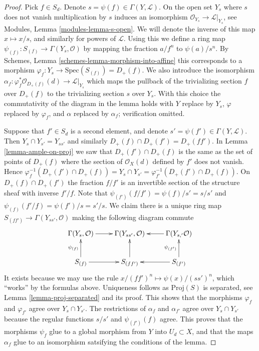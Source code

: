 \begin{proof}
Pick $f \in S_d$. Denote $s = \psi(f) \in \Gamma(Y, \mathcal{L})$.
On the open set $Y_s$ where $s$ does not vanish multiplication
by $s$ induces an isomorphism $\mathcal{O}_{Y_s} \to \mathcal{L}|_{Y_s}$,
see Modules, Lemma \ref{modules-lemma-s-open}. We will denote
the inverse of this map $x \mapsto x/s$, and similarly for
powers of $\mathcal{L}$. Using this we
define a ring map $\psi_{(f)} : S_{(f)} \to \Gamma(Y_s, \mathcal{O})$
by mapping the fraction $a/f^n$ to $\psi(a)/s^n$.
By Schemes, Lemma \ref{schemes-lemma-morphism-into-affine}
this corresponds to a morphism
$\varphi_f : Y_s \to \text{Spec}(S_{(f)}) = D_{+}(f)$.
We also introduce the isomorphism
$\alpha_f : \varphi_f^*\mathcal{O}_{D_{+}(f)}(d) \to \mathcal{L}|_{Y_s}$
which maps the pullback of the trivializing section
$f$ over $D_{+}(f)$ to the trivializing section $s$ over $Y_s$.
With this choice the commutativity of the diagram in the lemma
holds with $Y$ replace by $Y_s$, $\varphi$ replaced by $\varphi_f$,
and $\alpha$ replaced by $\alpha_f$; verification omitted.

\medskip\noindent
Suppose that $f' \in S_d$ is a second element, and denote
$s' = \psi(f') \in \Gamma(Y, \mathcal{L})$. Then
$Y_s \cap Y_{s'} = Y_{ss'}$ and similarly
$D_{+}(f) \cap D_{+}(f') = D_{+}(ff')$.
In Lemma \ref{lemma-ample-on-proj} we saw that
$D_{+}(f') \cap D_{+}(f)$ is the same as the set
of points of $D_{+}(f)$ where the section of
$\mathcal{O}_X(d)$ defined by $f'$ does not vanish.
Hence
$\varphi_f^{-1}(D_{+}(f') \cap D_{+}(f)) = Y_s \cap Y_{s'}
= \varphi_{f'}^{-1}(D_{+}(f') \cap D_{+}(f))$.
On $D_{+}(f) \cap D_{+}(f')$ the fraction $f/f'$ is an
invertible section of the structure sheaf with inverse
$f'/f$. Note that $\psi_{(f')}(f/f') = \psi(f)/s' = s/s'$
and $\psi_{(f)}(f'/f) = \psi(f')/s = s'/s$. We claim there
is a unique ring map
$S_{(ff')} \to \Gamma(Y_{ss'}, \mathcal{O})$ making the
following diagram commute
$$
\xymatrix{
\Gamma(Y_s, \mathcal{O}) \ar[r] &
\Gamma(Y_{ss'}, \mathcal{O}) &
\Gamma(Y_{s, '} \mathcal{O}) \ar[l]\\
S_{(f)} \ar[r] \ar[u]^{\psi_{(f)}} &
S_{(ff')} \ar[u] &
S_{(f')} \ar[l] \ar[u]^{\psi_{(f')}}
}
$$
It exists because we may use the rule
$x/(ff')^n \mapsto \psi(x)/(ss')^n$, which ``works'' by the formulas
above. Uniqueness follows as $\text{Proj}(S)$ is separated, see
Lemma \ref{lemma-proj-separated} and its proof. This shows that the
morphisms $\varphi_f$ and $\varphi_{f'}$ agree over $Y_s \cap Y_{s'}$.
The restrictions of $\alpha_f$ and $\alpha_{f'}$ agree over
$Y_s \cap Y_{s'}$ because the regular functions $s/s'$ and
$\psi_{(f')}(f)$ agree. This proves that the morphisms $\psi_f$
glue to a global morphism from $Y$ into $U_d \subset X$, and
that the maps $\alpha_f$ glue to an isomorphism satsifying the
conditions of the lemma.


\end{proof}
